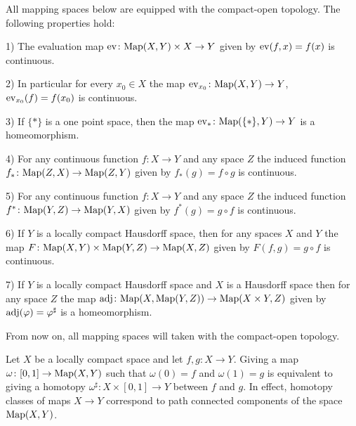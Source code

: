 \begin{nn} 
\label{MAPPING SPACE PROPERTIES NN}
All mapping spaces below are equipped with the compact-open topology. 
The following properties hold:
\benu
\item[1)] The evaluation map $\operatorname{ev}\colon \mathrm{Map}(X, Y)\times X \to Y$ given by $\operatorname{ev}(f, x) = f(x)$
is continuous. \\[-2mm]

\item[2)] In particular for every $x_{0}\in X$ the map 
$\operatorname{ev}_{x_{0}}\colon \mathrm{Map}(X, Y) \to Y$, $\operatorname{ev}_{x_{0}}(f) = f(x_{0})$ is continuous. \\[-2mm]

\item[3)] If $\{\ast\}$ is a one point space, then the map 
$\operatorname{ev}_{\ast}\colon \mathrm{Map}(\{\ast\}, Y) \to Y$ is a homeomorphism. \\[-2mm]

\item[4)] For any continuous function $f\colon X \to Y$ and any space $Z$
the induced function $f_{\ast}\colon \mathrm{Map}(Z, X) \to \mathrm{Map}(Z, Y)$ given by 
$f_{\ast}(g) = f\circ g$ is continuous. \\[-2mm]

\item[5)] For any continuous function $f\colon X \to Y$ and any space $Z$
the induced function $f^{\ast}\colon \mathrm{Map}(Y, Z) \to \mathrm{Map}(Y, X)$ given by 
$f^{\ast}(g) = g\circ f$ is continuous. \\[-2mm]

\item[6)] If $Y$ is a locally compact Hausdorff space, then for any spaces 
$X$ and $Y$ the map $F\colon \mathrm{Map}(X, Y)\times \mathrm{Map}(Y, Z) \to \mathrm{Map}(X, Z)$
given by $F(f, g) = g\circ f$ is continuous. \\[-2mm]

\item[7)] If $Y$ is a locally compact Hausdorff space and $X$ is a Hausdorff space
then for any space $Z$ the map $\operatorname{adj}\colon \mathrm{Map}(X, \mathrm{Map}(Y, Z)) \to \mathrm{Map}(X\times Y, Z)$  
given by $\operatorname{adj}(\varphi) = \varphi^{\sharp}$ is a homeomorphism. \\[-2mm]

\eenu
\end{nn}


From now on, all mapping spaces will taken with the compact-open topology.

\begin{example}
\label{MAP PATH COMPONENTS EXAMPLE}
Let $X$ be a locally compact space and let $f, g\colon X \to Y$. 
Giving a map $\omega \colon [0, 1] \to \mathrm{Map}(X, Y)$ such that $\omega(0) = f$ 
and $\omega(1) = g$ is equivalent to giving a homotopy 
$\omega^{\sharp} \colon X\times [0, 1] \to Y$ between $f$ and $g$. 
In effect, homotopy classes of maps $X\to Y$ correspond to path connected components 
of the space $\mathrm{Map}(X, Y)$. 
\end{example}

